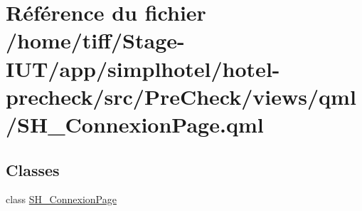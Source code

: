 \hypertarget{SH__ConnexionPage_8qml}{\section{Référence du fichier /home/tiff/\-Stage-\/\-I\-U\-T/app/simplhotel/hotel-\/precheck/src/\-Pre\-Check/views/qml/\-S\-H\-\_\-\-Connexion\-Page.qml}
\label{SH__ConnexionPage_8qml}
}
\subsection*{Classes}
\begin{DoxyCompactItemize}
\item 
class \hyperlink{classSH__ConnexionPage}{S\-H\-\_\-\-Connexion\-Page}
\end{DoxyCompactItemize}
